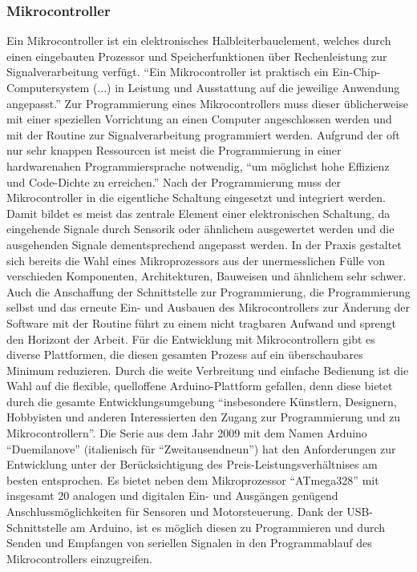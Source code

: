 \documentclass[a4paper, 12pt, bibtotocnumbered, liststotocnumbered]{scrartcl}
\begin{document}
	\subsubsection{Mikrocontroller}
	Ein Mikrocontroller ist ein elektronisches Halbleiterbauelement, welches durch einen eingebauten Prozessor und Speicherfunktionen über Rechenleistung zur Signalverarbeitung verfügt. “Ein Mikrocontroller ist praktisch ein Ein-Chip-Computersystem (...) in Leistung und Ausstattung auf die jeweilige Anwendung angepasst.”
	Zur Programmierung eines Mikrocontrollers muss dieser üblicherweise mit einer speziellen Vorrichtung an einen Computer angeschlossen werden und mit der Routine zur Signalverarbeitung programmiert werden. Aufgrund der oft nur sehr knappen Ressourcen ist meist die Programmierung in einer hardwarenahen Programmiersprache notwendig, “um möglichst hohe Effizienz und Code-Dichte zu erreichen.” Nach der Programmierung muss der Mikrocontroller in die eigentliche Schaltung eingesetzt und integriert werden. Damit bildet es meist das zentrale Element einer elektronischen Schaltung, da eingehende Signale durch Sensorik oder ähnlichem ausgewertet werden und die ausgehenden Signale dementsprechend angepasst werden.
	In der Praxis gestaltet sich bereits die Wahl eines Mikroprozessors aus der unermesslichen Fülle von verschieden Komponenten, Architekturen, Bauweisen und ähnlichem sehr schwer. Auch die Anschaffung der Schnittstelle zur Programmierung, die Programmierung selbst und das erneute Ein- und Ausbauen des Mikrocontrollers zur Änderung der Software mit der Routine führt zu einem nicht tragbaren Aufwand und sprengt den Horizont der Arbeit.
	Für die Entwicklung mit Mikrocontrollern gibt es diverse Plattformen, die diesen gesamten Prozess auf ein überschaubares Minimum reduzieren. Durch die weite Verbreitung und einfache Bedienung ist die Wahl auf die flexible, quelloffene Arduino-Plattform gefallen, denn diese bietet durch die gesamte Entwicklungsumgebung “insbesondere Künstlern, Designern, Hobbyisten und anderen Interessierten den Zugang zur Programmierung und zu Mikrocontrollern”.
	Die Serie aus dem Jahr 2009 mit dem Namen Arduino “Duemilanove” (italienisch für “Zweitausendneun”) hat den Anforderungen zur Entwicklung unter der Berücksichtigung des Preis-Leistungsverhältnises am besten entsprochen. Es bietet neben dem Mikroprozessor “ATmega328” mit insgesamt 20 analogen und digitalen Ein- und Ausgängen genügend Anschlussmöglichkeiten für Sensoren und Motorsteuerung.
	Dank der USB-Schnittstelle am Arduino, ist es möglich diesen zu Programmieren und durch Senden und Empfangen von seriellen Signalen in den Programmablauf des Mikrocontrollers einzugreifen.
\end{document}
